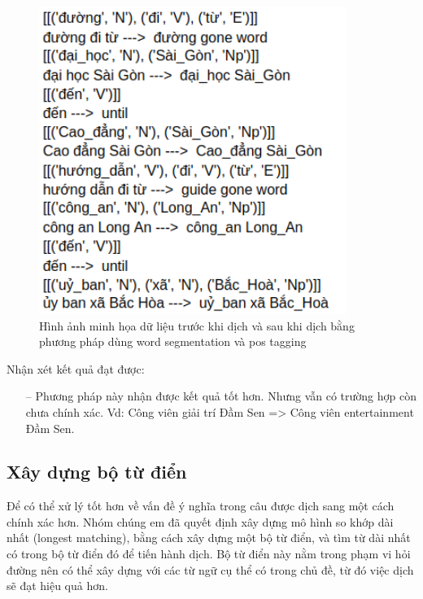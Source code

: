 \begin{figure}[htp]
    \centering
    \includegraphics[width=10cm]{images/trainingdata-wordsegment.png}
    \caption{Hình ảnh minh họa dữ liệu trước khi dịch và sau khi dịch bằng phương pháp dùng word segmentation và pos tagging}
    \label{fig:trainingdata-wordsegment}
\end{figure}

Nhận xét kết quả đạt được:
\begin{itemize}
    \item[--] Phương pháp này nhận được kết quả tốt hơn. Nhưng vẫn có trường hợp còn chưa chính xác. Vd: Công viên giải trí Đầm Sen => Công viên entertainment Đầm Sen.
   
\end{itemize}

\subsection{Xây dựng bộ từ điển}
Để có thể xử lý tốt hơn về vấn đề ý nghĩa trong câu được dịch sang một cách chính xác hơn. Nhóm chúng em đã quyết định xây dựng mô hình so khớp dài nhất (longest matching), bằng cách xây dựng một bộ từ điển, và tìm từ dài nhất có trong bộ từ điển đó để tiến hành dịch. Bộ từ điển này nằm trong phạm vi hỏi đường nên có thể xây dựng với các từ ngữ cụ thể có trong chủ đề, từ đó việc dịch sẽ đạt hiệu quả hơn.

